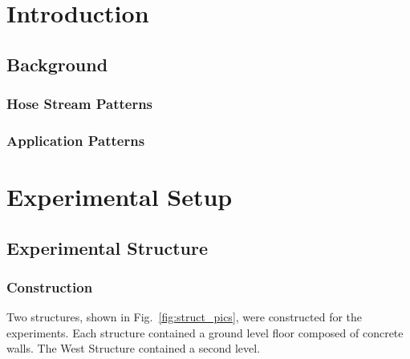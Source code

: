 \documentclass[12pt,oneside]{book}
\begin{document}
\mainmatter

\chapter{Introduction}
\label{chap:Introduction}

\section{Background}
\label{sec:Background}

\subsection{Hose Stream Patterns}
\label{sec:Hose_Stream_Patterns}

\subsection{Application Patterns}
\label{Application_Patterns}

\chapter{Experimental Setup}
\label{chap:Experimental_Setup}

\section{Experimental Structure}
\label{sec:Experimental_Structure}

\subsection{Construction}
\label{sec:Construction}
Two structures, shown in Fig.~\ref{fig:struct_pics}, were constructed for the experiments. Each structure contained a ground level floor composed of concrete walls. The West Structure contained a second level.
\end{document}

